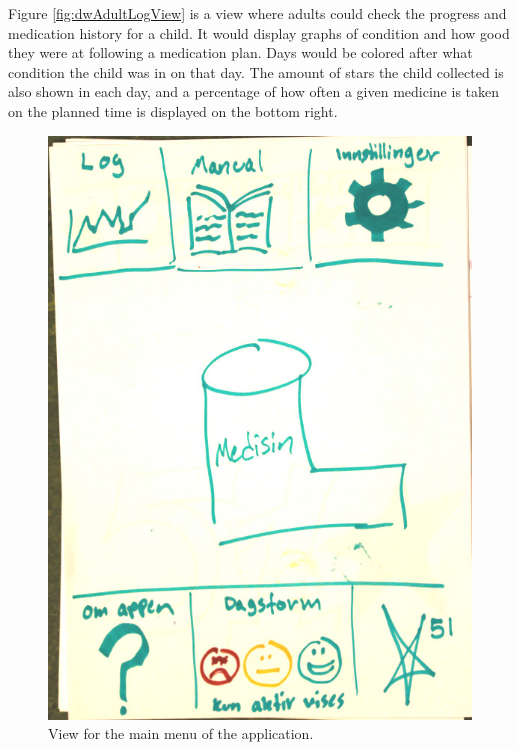 Figure \ref{fig:dwAdultLogView} is a view where adults could check the progress and
medication history for a child. It would display graphs of condition and how good they
were at following a medication plan. Days would be colored after what condition the 
child was in on that day. The amount of stars the child collected is also shown in each
day, and a percentage of how often a given medicine is taken on the planned time is
displayed on the bottom right.

\begin{figure}
	\begin{minipage}[b]{0.46\linewidth}
		\centering
			\includegraphics[width=0.34\paperwidth]{Pictures/DesignWorkshop/MobileMainMenu}
		\caption[Main menu view from design workshop]{View for the main menu of the application.}
		\label{fig:dwMainMenu}
	\end{minipage}
	\hspace{1cm}
	\begin{minipage}[b]{0.46\linewidth}

\end{minipage}
\end{figure}

